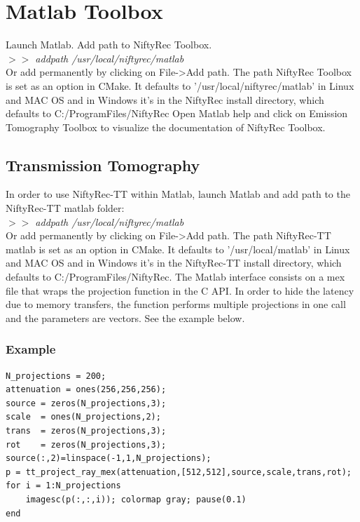 \documentclass[12pt,a4paper]{report}
\begin{document}
\section{Matlab Toolbox}
\noindent Launch Matlab. Add path to NiftyRec Toolbox. \\

\emph{$>>$ addpath /usr/local/niftyrec/matlab}\\

\noindent Or add permanently by clicking on File->Add path. 
The path NiftyRec Toolbox is set as an option in CMake. 
It defaults to '/usr/local/niftyrec/matlab' in Linux and MAC OS and in Windows 
it's in the NiftyRec install directory, which defaults to C:/ProgramFiles/NiftyRec
Open Matlab help and click on Emission Tomography Toolbox 
to visualize the documentation of NiftyRec Toolbox.

\subsection{Transmission Tomography}
In order to use NiftyRec-TT within Matlab, launch Matlab and add path to the NiftyRec-TT matlab folder: \\

\emph{$>>$ addpath /usr/local/niftyrec/matlab}\\

\noindent Or add permanently by clicking on File->Add path. 
The path NiftyRec-TT matlab is set as an option in CMake. 
It defaults to '/usr/local/matlab' in Linux and MAC OS and in Windows 
it's in the NiftyRec-TT install directory, which defaults to C:/ProgramFiles/NiftyRec. 
The Matlab interface consists on a mex file that wraps the projection function in the C API. 
In order to hide the latency due to memory transfers, the function performs multiple 
projections in one call and the parameters are vectors. See the example below. 

\subsubsection{Example}

\vspace{5mm}
\lstset{language=Matlab,basicstyle=\scriptsize}
\begin{lstlisting}
N_projections = 200;
attenuation = ones(256,256,256);
source = zeros(N_projections,3);
scale  = ones(N_projections,2);
trans  = zeros(N_projections,3);
rot    = zeros(N_projections,3);
source(:,2)=linspace(-1,1,N_projections);
p = tt_project_ray_mex(attenuation,[512,512],source,scale,trans,rot);
for i = 1:N_projections
    imagesc(p(:,:,i)); colormap gray; pause(0.1)
end
\end{lstlisting}
\vspace{5mm}
\end{document}
